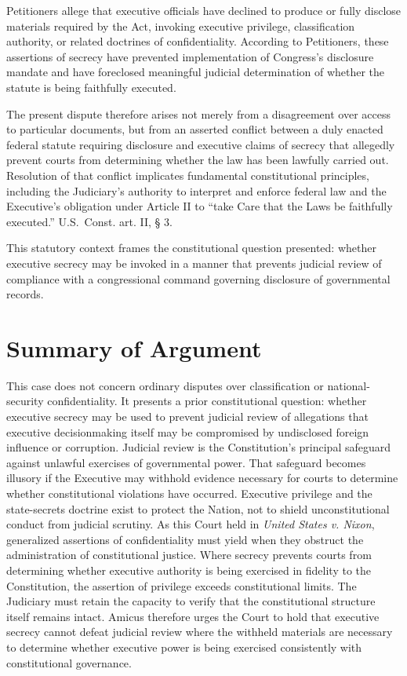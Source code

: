 \documentclass[12pt]{article}
\begin{document}
Petitioners allege that executive officials have declined to produce or fully disclose materials required by the Act, invoking executive privilege, classification authority, or related doctrines of confidentiality.
According to Petitioners, these assertions of secrecy have prevented implementation of Congress’s disclosure mandate and have foreclosed meaningful judicial determination of whether the statute is being faithfully executed.

The present dispute therefore arises not merely from a disagreement over access to particular documents, but from an asserted conflict between a duly enacted federal statute requiring disclosure and executive claims of secrecy that allegedly prevent courts from determining whether the law has been lawfully carried out.
Resolution of that conflict implicates fundamental constitutional principles, including the Judiciary’s authority to interpret and enforce federal law and the Executive’s obligation under Article II to “take Care that the Laws be faithfully executed.” U.S.\ Const.
art. II, § 3.

This statutory context frames the constitutional question presented: whether executive secrecy may be invoked in a manner that prevents judicial review of compliance with a congressional command governing disclosure of governmental records.

\section*{Summary of Argument}
This case does not concern ordinary disputes over classification or national-security confidentiality.
It presents a prior constitutional question: whether executive secrecy may be used to prevent judicial review of allegations that executive decisionmaking itself may be compromised by undisclosed foreign influence or corruption.
Judicial review is the Constitution's principal safeguard against unlawful exercises of governmental power.
That safeguard becomes illusory if the Executive may withhold evidence necessary for courts to determine whether constitutional violations have occurred.
Executive privilege and the state-secrets doctrine exist to protect the Nation, not to shield unconstitutional conduct from judicial scrutiny.
As this Court held in \emph{United States v. Nixon}, generalized assertions of confidentiality must yield when they obstruct the administration of constitutional justice.
Where secrecy prevents courts from determining whether executive authority is being exercised in fidelity to the Constitution, the assertion of privilege exceeds constitutional limits.
The Judiciary must retain the capacity to verify that the constitutional structure itself remains intact.
Amicus therefore urges the Court to hold that executive secrecy cannot defeat judicial review where the withheld materials are necessary to determine whether executive power is being exercised consistently with constitutional governance.
\end{document}
